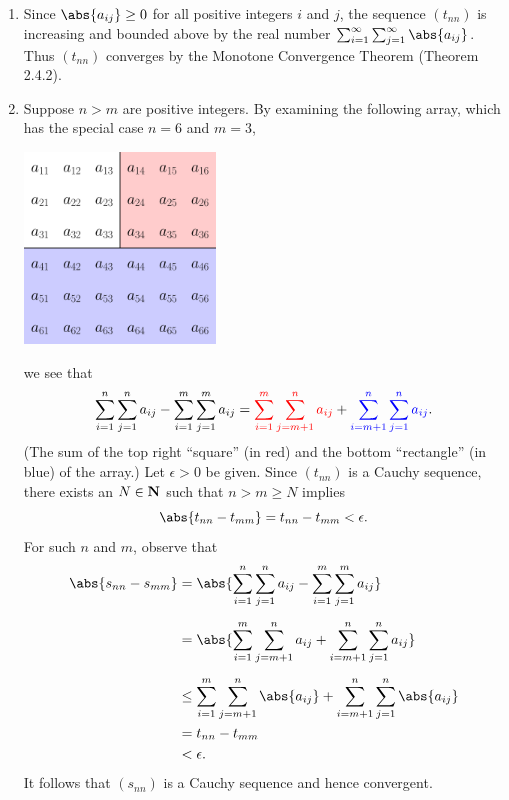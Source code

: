 \documentclass{lew98_solutions}
\begin{document}
\begin{solution}
    \begin{enumerate}
        \item Since \( \abs{a_{ij}} \geq 0 \) for all positive integers \( i \) and \( j \), the sequence \( (t_{nn}) \) is increasing and bounded above by the real number \( \sum_{i=1}^{\infty} \sum_{j=1}^{\infty} \abs{a_{ij}} \). Thus \( (t_{nn}) \) converges by the Monotone Convergence Theorem (Theorem 2.4.2).

        \item Suppose \( n > m \) are positive integers. By examining the following array, which has the special case \( n = 6 \) and \( m = 3 \),
        \begin{center}
            \includegraphics[width=0.4\textwidth]{UA_Figures/UA_ex2_8_3_fig.pdf}
        \end{center}
        we see that
        \[
            \sum_{i=1}^n \sum_{j=1}^n a_{ij} - \sum_{i=1}^m \sum_{j=1}^m a_{ij} = \textcolor{red}{\sum_{i=1}^m \sum_{j=m+1}^n a_{ij}} + \textcolor{blue}{\sum_{i=m+1}^n \sum_{j=1}^n a_{ij}}.
        \]
        (The sum of the top right ``square'' (in red) and the bottom ``rectangle'' (in blue) of the array.) Let \( \epsilon > 0 \) be given. Since \( (t_{nn}) \) is a Cauchy sequence, there exists an \( N \in \mathbf{N} \) such that \( n > m \geq N \) implies
        \[
            \abs{t_{nn} - t_{mm}} = t_{nn} - t_{mm} < \epsilon.
        \]
        For such \( n \) and \( m \), observe that
        \begin{align*}
            \abs{s_{nn} - s_{mm}} &= \abs{\sum_{i=1}^n \sum_{j=1}^n a_{ij} - \sum_{i=1}^m \sum_{j=1}^m a_{ij}} \\[2mm]
            &= \abs{\sum_{i=1}^m \sum_{j=m+1}^n a_{ij} + \sum_{i=m+1}^n \sum_{j=1}^n a_{ij}} \\[2mm]
            &\leq \sum_{i=1}^m \sum_{j=m+1}^n \abs{a_{ij}} + \sum_{i=m+1}^n \sum_{j=1}^n \abs{a_{ij}} \\
            &= t_{nn} - t_{mm} \\
            &< \epsilon.
        \end{align*}
        It follows that \( (s_{nn}) \) is a Cauchy sequence and hence convergent.
    \end{enumerate}
\end{solution}
\end{document}
